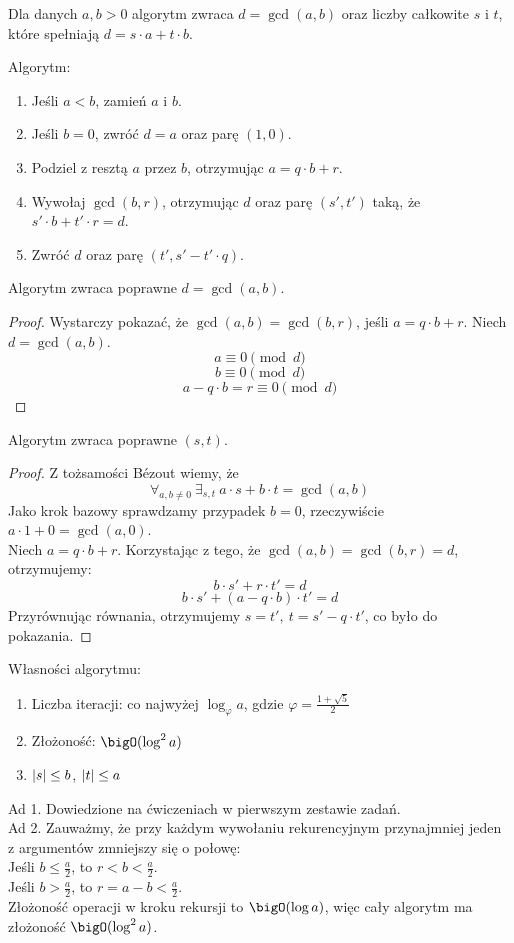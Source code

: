 Dla danych \( a, b > 0 \) algorytm zwraca \( d = \gcd(a,b) \) oraz liczby całkowite \( s \) i \( t \), które spełniają \( d = s\cdot a + t\cdot b \).

\begin{greyframe}
    Algorytm:
    \begin{enumerate}
        \item Jeśli \( a < b \), zamień \( a \) i \( b \).
        \item Jeśli \( b = 0 \), zwróć \( d = a \) oraz parę \( (1,0) \).
        \item Podziel z resztą \( a \) przez \( b \), otrzymując \( a = q \cdot b + r \).
        \item Wywołaj \( \gcd(b,r) \), otrzymując \( d \) oraz parę \( (s', t') \) taką, że \( s'\cdot b + t' \cdot r = d \).
        \item Zwróć \( d \) oraz parę \( (t', s' - t' \cdot q) \).
    \end{enumerate}
\end{greyframe}

\vspace{1em}\noindent
Algorytm zwraca poprawne \( d = \gcd(a, b) \).
\begin{proof}
    Wystarczy pokazać, że \( \gcd(a, b) = \gcd(b, r) \), jeśli \( a = q \cdot b + r \). Niech \( d = \gcd(a, b) \).
    \[
        a \equiv 0 \pmod{d}
    \]
    \[
        b \equiv 0 \pmod{d}
    \]
    \[
        a - q \cdot b = r \equiv 0 \pmod{d}
    \]
\end{proof}
Algorytm zwraca poprawne \( (s, t) \).
\begin{proof}
    Z tożsamości B\'ezout wiemy, że
    \[
        \forall_{a, b \not= 0 } \ \exists_{s, t} \ a \cdot s + b \cdot t = \gcd(a, b)
    \]
    Jako krok bazowy sprawdzamy przypadek \( b = 0 \), rzeczywiście \( a \cdot 1 + 0 = \gcd(a, 0) \). \\
    Niech \( a = q \cdot b + r \). Korzystając z tego, że \( \gcd(a, b) = \gcd(b, r) = d \), otrzymujemy:
    \[
        b \cdot s' + r \cdot t' = d
    \]
    \[
        b \cdot s' + (a - q \cdot b) \cdot t' = d
    \]
    Przyrównując równania, otrzymujemy \( s = t', \ t = s' - q \cdot t' \), co było do pokazania.
\end{proof}

Własności algorytmu:
\begin{enumerate}
    \item Liczba iteracji: co najwyżej \( \log_{\varphi} a \), gdzie \( \varphi = \frac{1 + \sqrt{5}}{2} \)
    \item Złożoność: \( \bigO(\log^2 a) \)
    \item \( \left\lvert s\right\rvert \leq b \), \( \left\lvert t\right\rvert \leq a \)
\end{enumerate}
Ad 1. Dowiedzione na ćwiczeniach w pierwszym zestawie zadań. \\
Ad 2. Zauważmy, że przy każdym wywołaniu rekurencyjnym przynajmniej jeden z argumentów zmniejszy się o połowę: \\
Jeśli \( b \leq \frac{a}{2} \), to \( r < b < \frac{a}{2} \). \\
Jeśli \( b > \frac{a}{2} \), to \( r = a - b < \frac{a}{2} \). \\
Złożoność operacji w kroku rekursji  to \( \bigO(\log a) \), więc cały algorytm ma złożoność \( \bigO(\log^2 a) \).